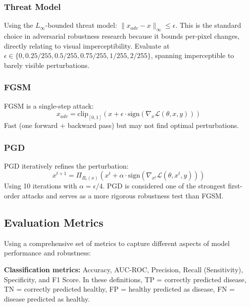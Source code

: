 \documentclass[12pt,a4paper]{article}
\begin{document}
\subsubsection{Threat Model}

Using the $L_\infty$-bounded threat model: $\|x_{adv} - x\|_\infty \leq \epsilon$. This is the standard choice in adversarial robustness research because it bounds per-pixel changes, directly relating to visual imperceptibility. Evaluate at $\epsilon \in \{0, 0.25/255, 0.5/255, 0.75/255, 1/255, 2/255\}$, spanning imperceptible to barely visible perturbations.

\subsubsection{FGSM}

FGSM \cite{goodfellow2015} is a single-step attack:
\begin{equation}
    x_{adv} = \text{clip}_{[0,1]}\left(x + \epsilon \cdot \text{sign}(\nabla_x \mathcal{L}(\theta, x, y))\right)
\end{equation}
Fast (one forward + backward pass) but may not find optimal perturbations.

\subsubsection{PGD}

PGD \cite{madry2018} iteratively refines the perturbation:
\begin{equation}
    x^{t+1} = \Pi_{B_\epsilon(x)} \left( x^t + \alpha \cdot \text{sign}(\nabla_{x^t} \mathcal{L}(\theta, x^t, y)) \right)
\end{equation}
Using 10 iterations with $\alpha = \epsilon/4$. PGD is considered one of the strongest first-order attacks and serves as a more rigorous robustness test than FGSM.

\subsection{Evaluation Metrics}

Using a comprehensive set of metrics to capture different aspects of model performance and robustness:

\textbf{Classification metrics:} Accuracy, AUC-ROC, Precision, Recall (Sensitivity), Specificity, and F1 Score. In these definitions, TP = correctly predicted disease, TN = correctly predicted healthy, FP = healthy predicted as disease, FN = disease predicted as healthy.
\end{document}
